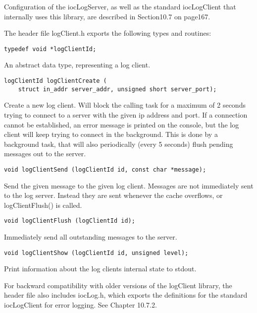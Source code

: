 Configuration of the iocLogServer, as well as the standard iocLogClient that internally uses this library, are described in 
Section10.7 on page167.

The header file logClient.h exports the following types and routines:

\begin{verbatim}
typedef void *logClientId;
\end{verbatim}

    An abstract data type, representing a log client.

\begin{verbatim}
logClientId logClientCreate (
    struct in_addr server_addr, unsigned short server_port);
\end{verbatim}

    Create a new log client. Will block the calling task for a maximum of 2 seconds trying to connect to a server with the 
given ip address and port. If a connection cannot be established, an error message is printed on the console, but the log 
client will keep trying to connect in the background. This is done by a background task, that will also periodically (every 
5 seconds) flush pending messages out to the server.

\begin{verbatim}
void logClientSend (logClientId id, const char *message);
\end{verbatim}

Send the given message to the given log client. Messages are not immediately sent to the log server. Instead they are sent 
whenever the cache overflows, or logClientFlush() is called.

\begin{verbatim}
void logClientFlush (logClientId id);
\end{verbatim}

    Immediately send all outstanding messages to the server.

\begin{verbatim}
void logClientShow (logClientId id, unsigned level);
\end{verbatim}

    Print information about the log clients internal state to stdout.

For backward compatibility with older versions of the logClient library, the header file also includes iocLog.h, which 
exports the definitions for the standard iocLogClient for error logging. See Chapter 10.7.2.

